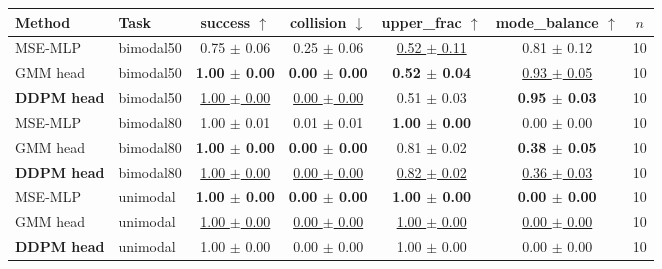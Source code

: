 \begin{tabular}{llccccc}
\toprule
Method & Task & success $\uparrow$ & collision $\downarrow$ & upper\_frac $\uparrow$ & mode\_balance $\uparrow$ & $n$ \\
\midrule
MSE-MLP & bimodal50 & 0.75 $\pm$ 0.06 & 0.25 $\pm$ 0.06 & \underline{0.52 $\pm$ 0.11} & 0.81 $\pm$ 0.12 & 10 \\
GMM head & bimodal50 & \textbf{1.00 $\pm$ 0.00} & \textbf{0.00 $\pm$ 0.00} & \textbf{0.52 $\pm$ 0.04} & \underline{0.93 $\pm$ 0.05} & 10 \\
\textbf{DDPM head} & bimodal50 & \underline{1.00 $\pm$ 0.00} & \underline{0.00 $\pm$ 0.00} & 0.51 $\pm$ 0.03 & \textbf{0.95 $\pm$ 0.03} & 10 \\
\midrule
MSE-MLP & bimodal80 & 1.00 $\pm$ 0.01 & 0.01 $\pm$ 0.01 & \textbf{1.00 $\pm$ 0.00} & 0.00 $\pm$ 0.00 & 10 \\
GMM head & bimodal80 & \textbf{1.00 $\pm$ 0.00} & \textbf{0.00 $\pm$ 0.00} & 0.81 $\pm$ 0.02 & \textbf{0.38 $\pm$ 0.05} & 10 \\
\textbf{DDPM head} & bimodal80 & \underline{1.00 $\pm$ 0.00} & \underline{0.00 $\pm$ 0.00} & \underline{0.82 $\pm$ 0.02} & \underline{0.36 $\pm$ 0.03} & 10 \\
\midrule
MSE-MLP & unimodal & \textbf{1.00 $\pm$ 0.00} & \textbf{0.00 $\pm$ 0.00} & \textbf{1.00 $\pm$ 0.00} & \textbf{0.00 $\pm$ 0.00} & 10 \\
GMM head & unimodal & \underline{1.00 $\pm$ 0.00} & \underline{0.00 $\pm$ 0.00} & \underline{1.00 $\pm$ 0.00} & \underline{0.00 $\pm$ 0.00} & 10 \\
\textbf{DDPM head} & unimodal & 1.00 $\pm$ 0.00 & 0.00 $\pm$ 0.00 & 1.00 $\pm$ 0.00 & 0.00 $\pm$ 0.00 & 10 \\
\bottomrule
\end{tabular}
